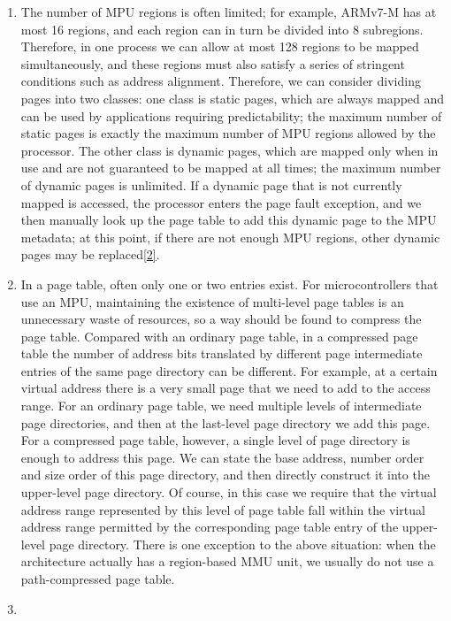\begin{enumerate}
\def\labelenumi{\arabic{enumi}.}
\item
  The number of MPU regions is often limited; for example, ARMv7-M has at most 16 regions, and each region can in turn be divided into 8 subregions. Therefore, in one process we can allow at most 128 regions to be mapped simultaneously, and these regions must also satisfy a series of stringent conditions such as address alignment. Therefore, we can consider dividing pages into two classes: one class is static pages, which are always mapped and can be used by applications requiring predictability; the maximum number of static pages is exactly the maximum number of MPU regions allowed by the processor. The other class is dynamic pages, which are mapped only when in use and are not guaranteed to be mapped at all times; the maximum number of dynamic pages is unlimited. If a dynamic page that is not currently mapped is accessed, the processor enters the page fault exception, and we then manually look up the page table to add this dynamic page to the MPU metadata; at this point, if there are not enough MPU regions, other dynamic pages may be replaced\hyperref[cite:3-2]{{[}2{]}}.
\item
  In a page table, often only one or two entries exist. For microcontrollers that use an MPU, maintaining the existence of multi-level page tables is an unnecessary waste of resources, so a way should be found to compress the page table. Compared with an ordinary page table, in a compressed page table the number of address bits translated by different page intermediate entries of the same page directory can be different. For example, at a certain virtual address there is a very small page that we need to add to the access range. For an ordinary page table, we need multiple levels of intermediate page directories, and then at the last-level page directory we add this page. For a compressed page table, however, a single level of page directory is enough to address this page. We can state the base address, number order and size order of this page directory, and then directly construct it into the upper-level page directory. Of course, in this case we require that the virtual address range represented by this level of page table fall within the virtual address range permitted by the corresponding page table entry of the upper-level page directory. There is one exception to the above situation: when the architecture actually has a region-based MMU unit, we usually do not use a path-compressed page table.
\item

\end{enumerate}
